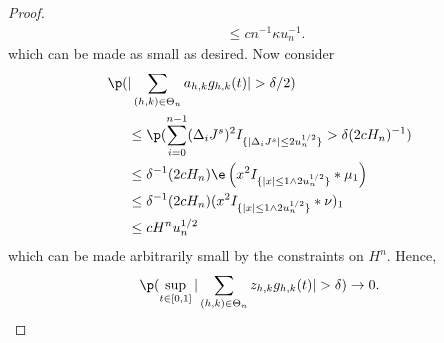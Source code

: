 \begin{proof}
\begin{align}
&\le cn^{-1}\kappa  u^{-1}_n.
\end{align}
which can be made as small as desired. Now consider
\begin{align}
  \p(&\vert \sumt a_{h,k} \ghk(t) \vert > \delta/2) \notag \\ &\le \p( \sumin (\djt)^2 I_{\{\vert \djt \vert \le 2u_n^{1/2} \}} > \delta (2 c H_n)^{-1} )\notag\\
  &\le\delta^{-1} (2 c H_n)\e\left( x^2I_{\{\vert x\vert \le 1 \wedge 2 u_n^{1/2}\}}\ast\mu_1  \right)\notag \\
  &\le \delta^{-1} (2 c H_n) (x^2I_{\{\vert x\vert \le 1 \wedge 2 u_n^{1/2}\}}\ast\nu)_1\notag \\
  &\le c H^n u^{1/2}_n \notag
\notag
\end{align}
which can be made arbitrarily small by the constraints on $H^n$.
Hence, 
\begin{align}
  \p(\sup_{t \in [0,1]}\vert \sumt z_{h,k} \ghk(t) \vert > \delta) \to 0.\label{eq:z}
\end{align}
\begin{comment}
Meanwhile, on $A_i \cap C_i$, it is easily seen that $\vert \djl \vert - \vert \dxc + \djt \vert < \vert \dx \vert \le u_n^{1/2}$, so that
\begin{align}
  \notag
  \dxf \djt I_{A_i \cap C_i} &\le \dxf \djt I_{\{\vert \djl \vert \le 4 u^{1/2}_n\}}\\
   &\le \dxc \djt I_{\{\vert \djl \vert \le 4 u^{1/2}_n\}} +  \djl \djt I_{\{\vert \djl \vert \le 4 u^{1/2}_n\}}\notag\\
   & =: \theta_i^1 + \theta_i^2\notag. 
  \label{}
\end{align}
Arguing as above, it is easily verified that $\e(\theta_i^1)  \le c \Delta_n^{5/4} u_n^{-1/8}$  so that 
\begin{align} 
  \p( \sup_{t \in \domain}\vert \sumt \sumin \btghki \theta^1_i \ghk(t)\vert > \eta) \le cH^n (u^{-1/2}_n\Delta_n)^{1/4} \notag \end{align}
Similarly,  $\e(\theta_i^2 I_{\Omega(n,q)}) \le q c \Delta_n u^{-1/4}_n$ so that  
\begin{align} 
  \p( \sup_{t \in \domain}\vert \sumt \sumin \btghki \theta^2_i &\ghk(t)\vert > \eta) \notag \\ &\le \p(\Omega(n,q)^c) + cH^n (u^{-1/2}_n\Delta_n)^{1/4} \notag \end{align}
Hence, 
\begin{align}
  \p(\sup_{t \in \domain} \vert \sumt p_{h,k} \ghk(t) \vert > \eta) \to 0.\notag
  \label{}
\end{align}
This completes the demonstration  that 
\begin{align}
  \p(\sup_{t \in \domain} \vert \sumt y_{h,k} \ghk(t) \vert > \eta) \to 0.\notag
  \label{}
\end{align}


\end{comment}
\end{proof}
